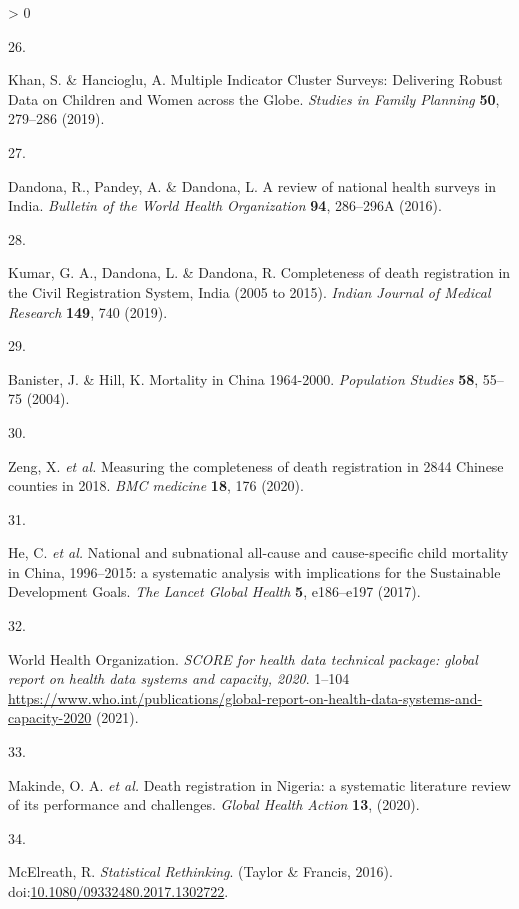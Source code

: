\documentclass[
]{article}
\newlength{\cslhangindent}
\newlength{\csllabelwidth}
\newenvironment{CSLReferences}[2] %
 {%
  \setlength{\parindent}{0pt}
  \ifodd #1 \everypar{\setlength{\hangindent}{\cslhangindent}}\ignorespaces\fi
  \ifnum #2 > 0
  \setlength{\parskip}{#2\baselineskip}
  \fi
 }%
 {}
\newcommand{\CSLLeftMargin}[1]{\parbox[t]{\csllabelwidth}{#1}}
\newcommand{\CSLRightInline}[1]{\parbox[t]{\linewidth - \csllabelwidth}{#1}\break}
\begin{document}
\begin{CSLReferences}{0}{0}
\leavevmode\hypertarget{ref-Khan2019}{}%
\CSLLeftMargin{26. }
\CSLRightInline{Khan, S. \& Hancioglu, A. {Multiple Indicator Cluster Surveys: Delivering Robust Data on Children and Women across the Globe}. \emph{Studies in Family Planning} \textbf{50}, 279--286 (2019).}

\leavevmode\hypertarget{ref-Dandona2016}{}%
\CSLLeftMargin{27. }
\CSLRightInline{Dandona, R., Pandey, A. \& Dandona, L. {A review of national health surveys in India}. \emph{Bulletin of the World Health Organization} \textbf{94}, 286--296A (2016).}

\leavevmode\hypertarget{ref-Kumar2019}{}%
\CSLLeftMargin{28. }
\CSLRightInline{Kumar, G. A., Dandona, L. \& Dandona, R. {Completeness of death registration in the Civil Registration System, India (2005 to 2015)}. \emph{Indian Journal of Medical Research} \textbf{149}, 740 (2019).}

\leavevmode\hypertarget{ref-Banister2004}{}%
\CSLLeftMargin{29. }
\CSLRightInline{Banister, J. \& Hill, K. {Mortality in China 1964-2000}. \emph{Population Studies} \textbf{58}, 55--75 (2004).}

\leavevmode\hypertarget{ref-Zeng2020}{}%
\CSLLeftMargin{30. }
\CSLRightInline{Zeng, X. \emph{et al.} {Measuring the completeness of death registration in 2844 Chinese counties in 2018}. \emph{BMC medicine} \textbf{18}, 176 (2020).}

\leavevmode\hypertarget{ref-He2017}{}%
\CSLLeftMargin{31. }
\CSLRightInline{He, C. \emph{et al.} {National and subnational all-cause and cause-specific child mortality in China, 1996--2015: a systematic analysis with implications for the Sustainable Development Goals}. \emph{The Lancet Global Health} \textbf{5}, e186--e197 (2017).}

\leavevmode\hypertarget{ref-WorldHealthOrganization2021}{}%
\CSLLeftMargin{32. }
\CSLRightInline{World Health Organization. \emph{{SCORE for health data technical package: global report on health data systems and capacity, 2020}}. 1--104 \url{https://www.who.int/publications/global-report-on-health-data-systems-and-capacity-2020} (2021).}

\leavevmode\hypertarget{ref-Makinde2020}{}%
\CSLLeftMargin{33. }
\CSLRightInline{Makinde, O. A. \emph{et al.} {Death registration in Nigeria: a systematic literature review of its performance and challenges}. \emph{Global Health Action} \textbf{13}, (2020).}

\leavevmode\hypertarget{ref-McElreath2016}{}%
\CSLLeftMargin{34. }
\CSLRightInline{McElreath, R. \emph{{Statistical Rethinking}}. (Taylor {\&} Francis, 2016). doi:\href{https://doi.org/10.1080/09332480.2017.1302722}{10.1080/09332480.2017.1302722}.}


\end{CSLReferences}
\end{document}
